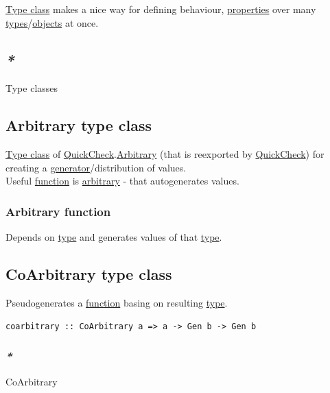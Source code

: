 \documentclass[a4paper,14pt,oneside]{book}
\begin{document}
\hyperref[orga93281c]{Type class} makes a nice way for defining behaviour, \hyperref[org7d3e89a]{properties} over many \hyperref[orga478d03]{types}/\hyperref[org82d454c]{objects} at once.\\

\subsection{\emph{*}}
\label{sec:orgd2a223c}

\label{orgc4b49e9}Type classes\\

\subsection{\label{org758c9aa}Arbitrary type class}
\label{sec:org7f13235}
\hyperref[orga93281c]{Type class} of \hyperref[org088544b]{QuickCheck}.\hyperref[org5a522bc]{Arbitrary} (that is reexported by \hyperref[org088544b]{QuickCheck}) for creating a \hyperref[org03ebadc]{generator}/distribution of values.\\
Useful \hyperref[org3b87f30]{function} is \hyperref[org5a522bc]{arbitrary} - that autogenerates values.\\

\subsubsection{\label{org46949c3}Arbitrary function}
\label{sec:org38bbc1e}
Depends on \hyperref[orga286a54]{type} and generates values of that \hyperref[orga286a54]{type}.\\

\subsection{\label{org452dbd0}CoArbitrary type class}
\label{sec:orgcba0895}
Pseudogenerates a \hyperref[org3b87f30]{function} basing on resulting \hyperref[orga286a54]{type}.\\
\begin{verbatim}
coarbitrary :: CoArbitrary a => a -> Gen b -> Gen b
\end{verbatim}

\subsubsection{\emph{*}}
\label{sec:org3ffad4a}

\label{org76c029f}CoArbitrary\\
\end{document}
